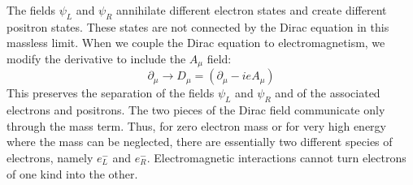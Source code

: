\documentclass[../../main/main.tex]{subfiles}
\begin{document}
The fields \( \psi_L \) and \( \psi_R \) annihilate different electron states and create different positron states. These states are not connected by the Dirac equation in this massless limit. When we couple the Dirac equation to electromagnetism, we modify the derivative to include the \( A_\mu \) field:
\begin{equation}
	\partial_\mu \longrightarrow D_\mu = (\partial_\mu - i e A_\mu)
	\label{eq:L06_GCD}
\end{equation}
This preserves the separation of the fields \( \psi_L \) and \( \psi_R \) and of the associated electrons and positrons. The two pieces of the Dirac field communicate only through the mass term. Thus, for zero electron mass or for very high energy where the mass can be neglected, there are essentially two different species of electrons, namely \( e^-_L \) and \( e^-_R \). Electromagnetic interactions cannot turn electrons of one kind into the other.
\end{document}
